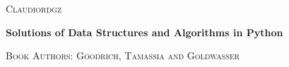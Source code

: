\newcommand{\HRule}{\rule{\linewidth}{0.2mm}}
\begin{titlepage}
\begin{center}

\begin{LOGOWEBPAGE}

\end{LOGOWEBPAGE}
\begin{navbartext}
	\textsc{Claudiordgz}\\[0.1cm]
\end{navbartext}
\vfill
\begin{navbartext}
	\Large \bfseries Solutions of Data Structures and Algorithms in Python\\[1cm]
\end{navbartext}
\begin{navbartext}
	\textsc{Book Authors: Goodrich, Tamassia and Goldwasser}\\[0.1cm]
\end{navbartext}

\end{center}
\end{titlepage}